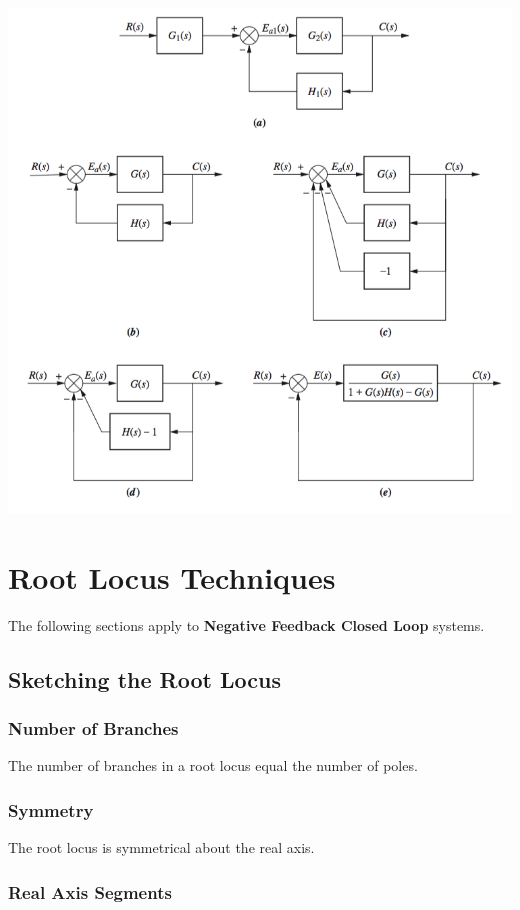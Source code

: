 \documentclass[11pt]{article}
\begin{document}
   \begin{center}
    \includegraphics[width=300 px]{img/nonunity} \\
    \end{center}

    \pagebreak


    \section{Root Locus Techniques}

    The following sections apply to \textbf{Negative Feedback Closed Loop} systems.

    \subsection{Sketching the Root Locus}

    \subsubsection{Number of Branches}

    The number of branches in a root locus equal the number of poles.

    \subsubsection{Symmetry}

    The root locus is symmetrical about the real axis.

    \subsubsection{Real Axis Segments}
\end{document}
